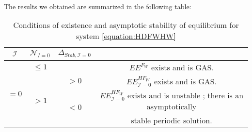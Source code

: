 \documentclass{article}
\newcommand{\lfw}{\lambda_{F}}
\newcommand{\lfw}{\lambda_{F}}
\newcommand{\cI}{\mathcal{I}}
\theoremstyle{definition}
\theoremstyle{remark}
\begin{document}
The results we obtained are summarized in the following table:
%



\begin{table}[!ht]
\centering
\def\arraystretch{2}
\begin{tabular}{c|c|c|c}
$\cI$  & $\mathcal{N}_{I =0}$ &  $\Delta_{Stab, \cI =0}$ & \\
\hline
\multirow{4}{*}{$=0$}& $ \leq 1$ & &$EE^{F_W}$ exists and is GAS.  \\
\cline{2-4}
 &  \multirow{3}{*}{$> 1$} & $ >0$ &$EE^{HF_W}_{\cI=0}$ exists and is GAS.\\
 \cline{3-4}
 &  &\multirow{2}{*}{$ <0 $} & $EE^{HF_W}_{\cI=0}$ exists and is unstable ; there is an asymptotically \\
&  & &  stable periodic solution.
\end{tabular}
\caption{\centering Conditions of existence and asymptotic stability of equilibrium for system \eqref{equation:HDFWHW}}
\label{table:long term dynamic, I = 0}
\end{table}
\end{document}
